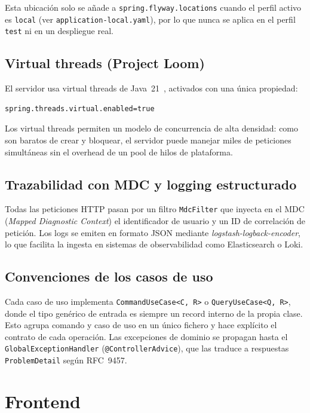 Esta ubicación solo se añade a \texttt{spring.flyway.locations} cuando el
perfil activo es \texttt{local} (ver \texttt{application-local.yaml}), por
lo que nunca se aplica en el perfil \texttt{test} ni en un despliegue real.

\subsection{Virtual threads (Project Loom)}

El servidor usa virtual threads de Java~21~\cite{projectloom}, activados con una única propiedad:

\begin{lstlisting}
spring.threads.virtual.enabled=true
\end{lstlisting}

Los virtual threads permiten un modelo de concurrencia de alta densidad: como
son baratos de crear y bloquear, el servidor puede manejar miles de peticiones
simultáneas sin el overhead de un pool de hilos de plataforma.

\subsection{Trazabilidad con MDC y logging estructurado}

Todas las peticiones HTTP pasan por un filtro \texttt{MdcFilter} que inyecta
en el MDC (\textit{Mapped Diagnostic Context}) el identificador de usuario y
un ID de correlación de petición. Los logs se emiten en formato JSON mediante
\textit{logstash-logback-encoder}, lo que facilita la ingesta en sistemas de
observabilidad como Elasticsearch o Loki.

\subsection{Convenciones de los casos de uso}

Cada caso de uso implementa \texttt{CommandUseCase<C, R>} o
\texttt{QueryUseCase<Q, R>}, donde el tipo genérico de entrada es siempre un
record interno de la propia clase. Esto agrupa comando y caso de uso en un
único fichero y hace explícito el contrato de cada operación. Las excepciones
de dominio se propagan hasta el \texttt{GlobalExceptionHandler}
(\texttt{@ControllerAdvice}), que las traduce a respuestas \texttt{ProblemDetail}
según RFC~9457.

\section{Frontend}
\label{sec:implementacion_frontend}


